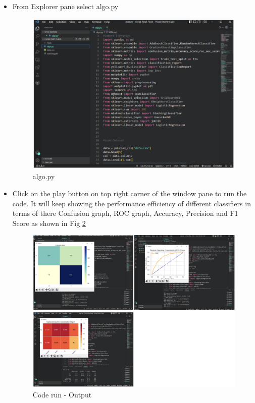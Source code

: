 \documentclass[10pt]{article}
\begin{document}
\begin{itemize}
\item From Explorer pane select algo.py
\begin{figure}[H]
    \begin{center}
        \includegraphics[width=0.7\linewidth, frame]{CA2-template/CM40.png}
       \caption{algo.py \label{fig:30}}
    \end{center}
\end{figure}

\item Click on the play button on top right corner of the window pane to run the code. It will keep showing the performance efficiency of different classifiers in terms of there Confusion graph, ROC graph, Accuracy, Precision and F1 Score as shown in Fig \ref{fig:31}
\begin{figure}[H]
    \begin{center}
        \includegraphics[width=0.7\linewidth, frame]{CA2-template/CM41.png}
       \caption{Code run - Output \label{fig:31}}
    \end{center}
\end{figure}
    
\end{itemize}
\end{document}
